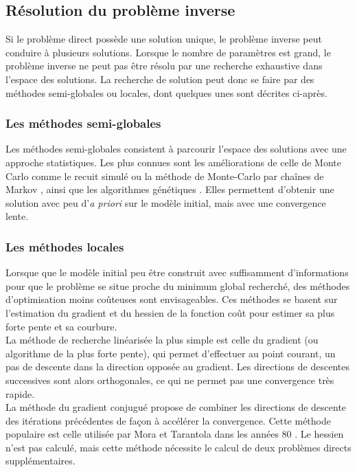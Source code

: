 \subsection{Résolution du problème inverse}
Si le problème direct possède une solution unique, le problème inverse peut conduire à plusieurs solutions.
Lorsque le nombre de paramètres est grand, le problème inverse ne peut pas être résolu par une recherche exhaustive dans l'espace des solutions. La recherche de solution peut donc se faire par des méthodes semi-globales ou locales, dont quelques unes sont décrites ci-après.\\

\subsubsection{Les méthodes semi-globales}
Les méthodes semi-globales consistent à parcourir l'espace des solutions avec une approche statistiques. Les plus connues sont les améliorations de celle de Monte Carlo comme le recuit simulé \citep{tarantola_book, sen} ou  la méthode de Monte-Carlo par chaînes de Markov \citep{zhang}, ainsi que les algorithmes génétiques \citep{stoffa}. Elles permettent d'obtenir une solution avec peu d'\emph{a priori} sur le modèle initial, mais avec une convergence lente.\\

\subsubsection{Les méthodes locales}
Lorsque que le modèle initial peu être construit avec suffisamment d'informations pour que le problème se situe proche du minimum global recherché, des méthodes d'optimisation moins coûteuses sont envisageables. Ces méthodes se basent sur l'estimation du gradient et du hessien de la fonction coût pour estimer sa plus forte pente et sa courbure.\\

La méthode de recherche linéarisée la plus simple est celle du gradient (ou algorithme de la plus forte pente), qui permet d'effectuer au point courant, un pas de descente dans la direction opposée au gradient. Les directions de descentes successives sont alors orthogonales, ce qui ne permet pas une convergence très rapide. \\
La méthode du gradient conjugué propose de combiner les directions de descente des itérations précédentes de façon à accélérer la convergence. Cette méthode populaire est celle utilisée par Mora et Tarantola dans les années 80 \citep{tarantola_84, mora_87a, mora_87b}. Le hessien n'est pas calculé, mais cette méthode nécessite le calcul de deux problèmes directs supplémentaires. \\

